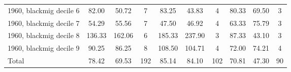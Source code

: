 \begin{table}[htbp]
\begin{tabular}{l*{3}{ccc}}
1960, blackmig decile 6&       82.00&       50.72&           7&       83.25&       43.83&           4&       80.33&       69.50&           3\\
1960, blackmig decile 7&       54.29&       55.56&           7&       47.50&       46.92&           4&       63.33&       75.79&           3\\
1960, blackmig decile 8&      136.33&      162.06&           6&      185.33&      237.90&           3&       87.33&       43.10&           3\\
1960, blackmig decile 9&       90.25&       86.25&           8&      108.50&      104.71&           4&       72.00&       74.21&           4\\
Total               &       78.42&       69.53&         192&       85.14&       84.10&         102&       70.81&       47.30&          90\\
\bottomrule
\end{tabular}
\end{table}
